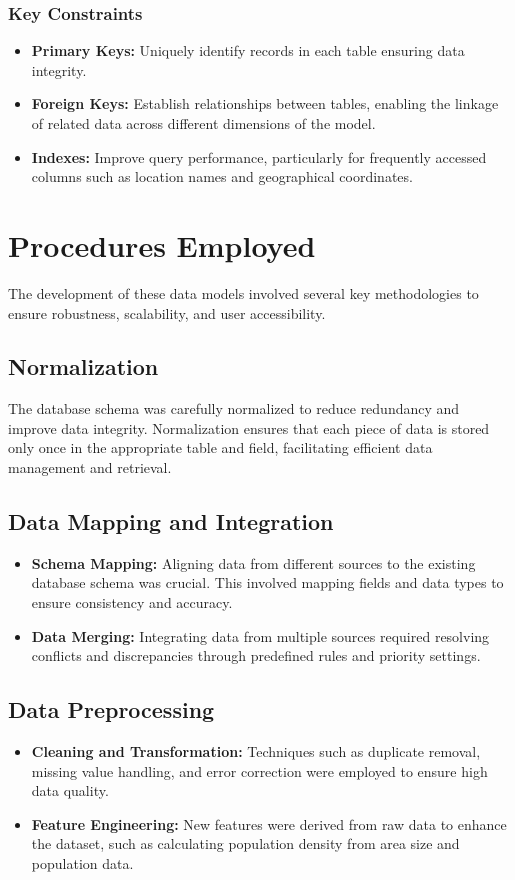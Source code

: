 \subsubsection{Key Constraints}
\begin{itemize}
    \item \textbf{Primary Keys:} Uniquely identify records in each table ensuring data integrity.
    \item \textbf{Foreign Keys:} Establish relationships between tables, enabling the linkage of related data across different dimensions of the model.
    \item \textbf{Indexes:} Improve query performance, particularly for frequently accessed columns such as location names and geographical coordinates.
\end{itemize}

\section{Procedures Employed}
The development of these data models involved several key methodologies to ensure robustness, scalability, and user accessibility.

\subsection{Normalization}
The database schema was carefully normalized to reduce redundancy and improve data integrity. Normalization ensures that each piece of data is stored only once in the appropriate table and field, facilitating efficient data management and retrieval.

\subsection{Data Mapping and Integration}
\begin{itemize}
    \item \textbf{Schema Mapping:} Aligning data from different sources to the existing database schema was crucial. This involved mapping fields and data types to ensure consistency and accuracy.
    \item \textbf{Data Merging:} Integrating data from multiple sources required resolving conflicts and discrepancies through predefined rules and priority settings.
\end{itemize}

\subsection{Data Preprocessing}
\begin{itemize}
    \item \textbf{Cleaning and Transformation:} Techniques such as duplicate removal, missing value handling, and error correction were employed to ensure high data quality.
    \item \textbf{Feature Engineering:} New features were derived from raw data to enhance the dataset, such as calculating population density from area size and population data.
\end{itemize}

